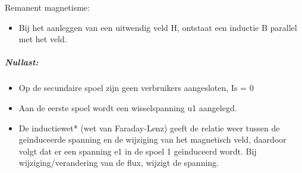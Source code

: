 \documentclass[12pt]{article}
\begin{document}
Remanent magnetisme:\begin{itemize}
    \item Bij het aanleggen van een uitwendig veld H, ontstaat een inductie B parallel met het veld.
\end{itemize}
\subparagraph{Nullast:}\begin{itemize}%
    \item Op de secundaire spoel zijn geen verbruikers aangesloten, Is = 0 
    \item Aan de eerste spoel wordt een wisselspanning u1 aangelegd. 
    \item De inductiewet* (wet van Faraday-Lenz) geeft de relatie weer tussen de geïnduceerde spanning en de wijziging van het magnetisch veld, daardoor volgt dat er een spanning e1 in de spoel 1 geïnduceerd wordt. Bij wijziging/verandering van de flux, wijzigt de spanning.
\end{itemize}
\end{document}
